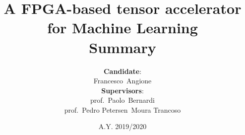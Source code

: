 \documentclass[12pt,a4paper,oneside]{report}
\newcommand{\thesistitle}{A FPGA-based tensor accelerator for Machine Learning}
\newcommand{\thesiscandidatename}{Francesco}
\newcommand{\thesiscandidatesurname}{Angione}
\newcommand{\thesissupervisoronetitle}{prof.}
\newcommand{\thesissupervisoronename}{Paolo}
\newcommand{\thesissupervisoronesurname}{Bernardi}
\newcommand{\thesissupervisortwotitle}{prof.}
\newcommand{\thesissupervisortwoname}{Pedro Petersen}
\newcommand{\thesissupervisortwosurname}{Moura Trancoso}
\newcommand{\thesisdate}{A.Y. 2019/2020}
\begin{document}
\title{\vspace*{-5mm}\textbf{\thesistitle}\\Summary} %
\date{\thesisdate}
\author{\textbf{Candidate}:\\\thesiscandidatename~\thesiscandidatesurname\\
\textbf{Supervisors}:\\\thesissupervisoronetitle~\thesissupervisoronename~\thesissupervisoronesurname\\
\thesissupervisortwotitle~\thesissupervisortwoname~\thesissupervisortwosurname\\
}%

\maketitle



%



\end{document}

